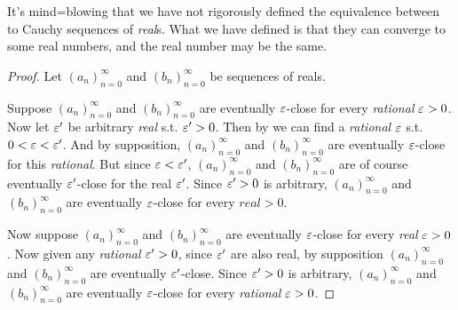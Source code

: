 \begin{note}
It's mind=blowing that we have not rigorously defined the equivalence between to Cauchy sequences of \emph{real}s.
What we have defined is that they can converge to some real numbers, and the real number may be the same.
\end{note}

\begin{proof}
Let \((a_n)_{n = 0}^{\infty}\) and \((b_n)_{n = 0}^{\infty}\) be sequences of reals.

Suppose \((a_n)_{n = 0}^{\infty}\) and \((b_n)_{n = 0}^{\infty}\) are eventually \(\varepsilon\)-close for every \emph{rational} \(\varepsilon > 0\).
Now let \(\varepsilon'\) be arbitrary \emph{real} s.t. \(\varepsilon' > 0\).
Then by  we can find a \emph{rational} \(\varepsilon\) s.t. \(0 < \varepsilon < \varepsilon'\).
And by supposition, \((a_n)_{n = 0}^{\infty}\) and \((b_n)_{n = 0}^{\infty}\) are eventually \(\varepsilon\)-close for this \emph{rational}.
But since \(\varepsilon < \varepsilon'\), \((a_n)_{n = 0}^{\infty}\) and \((b_n)_{n = 0}^{\infty}\) are of course eventually \(\varepsilon'\)-close for the real \(\varepsilon'\).
Since \(\varepsilon' > 0\) is arbitrary, \((a_n)_{n = 0}^{\infty}\) and \((b_n)_{n = 0}^{\infty}\) are eventually \(\varepsilon\)-close for every \(real > 0\).

Now suppose \((a_n)_{n = 0}^{\infty}\) and \((b_n)_{n = 0}^{\infty}\) are eventually \(\varepsilon\)-close for every \emph{real} \(\varepsilon > 0\).
Now given any \emph{rational} \(\varepsilon' > 0\), since \(\varepsilon'\) are also real, by supposition \((a_n)_{n = 0}^{\infty}\) and \((b_n)_{n = 0}^{\infty}\) are eventually \(\varepsilon'\)-close.
Since \(\varepsilon' > 0\) is arbitrary, \((a_n)_{n = 0}^{\infty}\) and \((b_n)_{n = 0}^{\infty}\) are eventually \(\varepsilon\)-close for every \emph{rational} \(\varepsilon > 0\).
\end{proof}